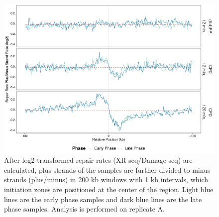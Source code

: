 \begin{figure}[H]
\begin{center}
\includegraphics[width=\textwidth]{Chapters/7_appendix/figures/supfig44}
\caption[Repair rate plus/minus ratio of initiation zones in 200 kb (replicate A).]{After log2-transformed repair rates (XR-seq/Damage-seq) are calculated, plus strands of the samples are further divided to minus strands (plus/minus) in 200 kb windows with 1 kb intervals, which initiation zones are positioned at the center of the region. Light blue lines are the early phase samples and dark blue lines are the late phase samples. Analysis is performed on replicate A.}
\label{supfig:rrpm200inzonesA}
\end{center}
\end{figure}

